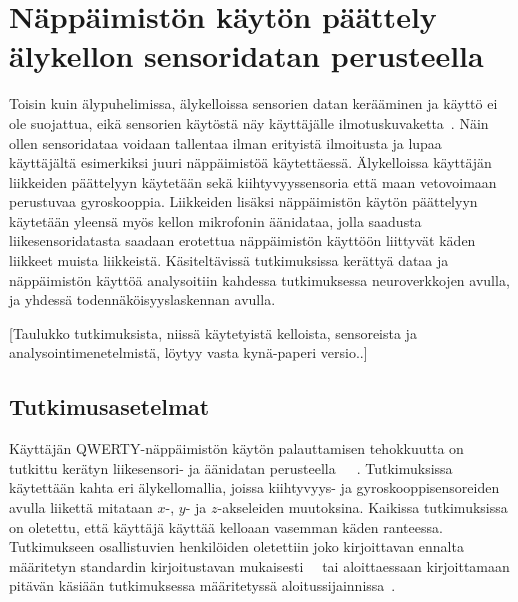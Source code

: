 \documentclass[finnish]{tktltiki2}
\theoremstyle{definition}
\theoremstyle{remark}
\begin{document}
\section{Näppäimistön käytön päättely älykellon sensoridatan perusteella}
Toisin kuin älypuhelimissa, älykelloissa sensorien datan kerääminen ja käyttö ei ole suojattua, eikä sensorien käytöstä näy käyttäjälle ilmotuskuvaketta~\cite{liu}. Näin ollen sensoridataa voidaan tallentaa ilman erityistä ilmoitusta ja lupaa käyttäjältä esimerkiksi juuri näppäimistöä käytettäessä.
Älykelloissa käyttäjän liikkeiden päättelyyn käytetään sekä kiihtyvyyssensoria että maan vetovoimaan perustuvaa gyroskooppia. Liikkeiden lisäksi näppäimistön käytön päättelyyn käytetään yleensä myös kellon mikrofonin äänidataa, jolla saadusta liikesensoridatasta saadaan erotettua näppäimistön käyttöön liittyvät käden liikkeet muista liikkeistä. Käsiteltävissä tutkimuksissa kerättyä dataa ja näppäimistön käyttöä analysoitiin kahdessa tutkimuksessa neuroverkkojen avulla, ja yhdessä todennäköisyyslaskennan avulla.

[Taulukko tutkimuksista, niissä käytetyistä kelloista, sensoreista ja analysointimenetelmistä, löytyy vasta kynä-paperi versio..]

\subsection{Tutkimusasetelmat}
Käyttäjän QWERTY-näppäimistön käytön palauttamisen tehokkuutta on tutkittu kerätyn liikesensori- ja äänidatan perusteella~\cite{maiti}~\cite{liu}~\cite{mole}. Tutkimuksissa käytettään kahta eri älykellomallia, joissa kiihtyvyys- ja gyroskooppisensoreiden avulla liikettä mitataan $x$-, $y$- ja $z$-akseleiden muutoksina. Kaikissa tutkimuksissa on oletettu, että käyttäjä käyttää kelloaan vasemman käden ranteessa. Tutkimukseen osallistuvien henkilöiden oletettiin joko kirjoittavan ennalta määritetyn standardin kirjoitustavan mukaisesti~\cite{maiti}~\cite{liu} tai aloittaessaan kirjoittamaan pitävän käsiään tutkimuksessa määritetyssä aloitussijainnissa~\cite{mole}. 
\end{document}
